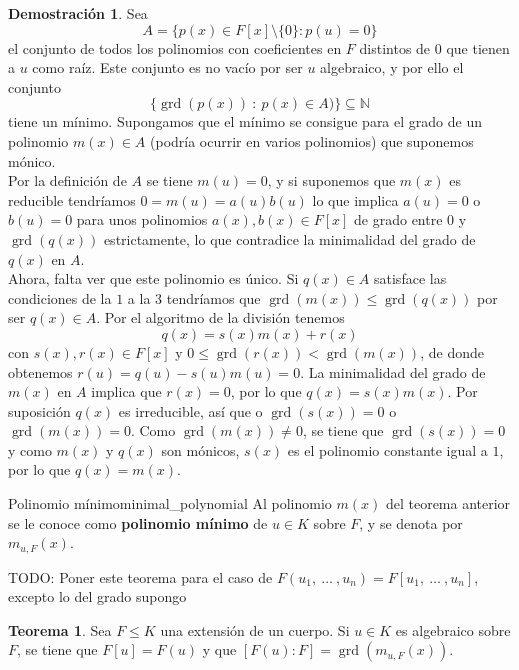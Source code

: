 \documentclass[a4paper]{book}
\theoremstyle{definition}
\newtheorem{theorem}{Teorema}[section]
\theoremstyle{ejemplo}
\theoremstyle{demostracion}
\newtheorem{dem}{Demostración}
\newcommand{\naturales}{\mathbb{N}}
\DeclareMathOperator{\grado}{grd}
\begin{document}
\begin{dem}
	Sea 
	\begin{equation*}
		A = \{ p(x) \in F[x] \setminus \{0\}:p(u) = 0\}
	\end{equation*} 
	el conjunto de todos los polinomios con coeficientes en $F$ distintos de $0$ que tienen a $u$ como raíz. Este conjunto es no vacío por ser $u$ algebraico, y por ello el conjunto 
	\begin{equation*}
	\{ \grado(p(x))\ :\ p(x) \in A)\} \subseteq \naturales
	\end{equation*}
	tiene un mínimo. Supongamos que el mínimo se consigue para el grado de un polinomio $m(x) \in A$ (podría ocurrir en varios polinomios) que suponemos mónico.\\
	Por la definición de $A$ se tiene $m(u) = 0$, y si suponemos que $m(x)$ es reducible tendríamos $0 = m(u) = a(u)b(u)$ lo que implica $a(u) = 0$ o $b(u) = 0$ para unos polinomios $a(x), b(x) \in F[x]$ de grado entre $0$ y $\grado(q(x))$ estrictamente, lo que contradice la minimalidad del grado de $q(x)$ en $A$.\\ 
	Ahora, falta ver que este polinomio es único. Si $q(x) \in A$ satisface las condiciones de la $1$ a la $3$ tendríamos que $\grado(m(x)) \leq \grado(q(x))$ por ser $q(x) \in A$. Por el algoritmo de la división tenemos 
	\begin{equation*}
		q(x) = s(x)m(x) + r(x)
	\end{equation*}	
	con $s(x), r(x) \in F[x]$ y $0 \leq \grado(r(x)) < \grado(m(x))$, de donde obtenemos $r(u) = q(u) - s(u)m(u) = 0$. La minimalidad del grado de $m(x)$ en $A$ implica que $r(x) = 0$, por lo que $q(x) = s(x)m(x)$. Por suposición $q(x)$ es irreducible, así que o $\grado(s(x)) = 0$ o $\grado(m(x)) = 0$. Como $\grado(m(x)) \neq 0$, se tiene que $\grado(s(x)) = 0$ y como $m(x)$ y $q(x)$ son mónicos, $s(x)$ es el polinomio constante igual a $1$, por lo que $q(x) = m(x)$.
\end{dem}

\begin{define}{Polinomio mínimo}{minimal_polynomial}
	Al polinomio $m(x)$ del teorema anterior se le conoce como \textbf{polinomio mínimo} de $u \in K$ sobre $F$, y se denota por $m_{u,F}(x)$.
\end{define}

TODO: Poner este teorema para el caso de $F(u_1,\ \ldots\ ,u_n) = F[u_1,\ \ldots\ ,u_n]$, excepto lo del grado supongo

\begin{theorem}
	Sea $F \leq K$ una extensión de un cuerpo. Si $u \in K$ es algebraico sobre $F$, se tiene que $F[u] = F(u)$ y que $[F(u):F] = \grado(m_{u,F}(x)).$
\end{theorem}
\end{document}
